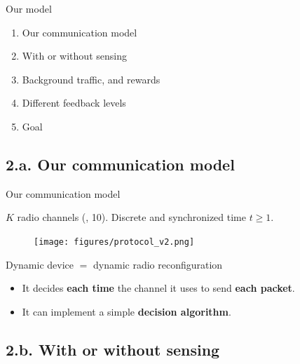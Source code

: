 \documentclass[12pt,english,ignorenonframetext,]{beamer}
\providecommand{\tightlist}{%
  \setlength{\itemsep}{0pt}\setlength{\parskip}{0pt}}
\begin{document}
\begin{frame}{Our model}

\begin{enumerate}
\def\labelenumi{\arabic{enumi}.}
\tightlist
\item Our communication model
\item With or without sensing
\item Background traffic, and rewards
\item Different feedback levels
\item Goal
\end{enumerate}

\end{frame}

\subsection{\hfill{}2.a. Our communication model\hfill{}}

\begin{frame}{Our communication model}

\(K\) radio channels (\eg, 10).
Discrete and synchronized time \(t\geq1\).

\begin{figure}[h!]
\centering
\texttt{[image: figures/protocol\_v2.png]}
\end{figure}

\pause

\begin{block}{Dynamic device \(=\) dynamic radio reconfiguration}

\begin{itemize}\tightlist
\item
  It decides \textbf{each time} the channel it uses to send \textbf{each
  packet}.
\item
  It can implement a simple \textbf{decision algorithm}.
\end{itemize}

\end{block}

\end{frame}



\subsection{\hfill{}2.b. With or without sensing\hfill{}}
\end{document}
